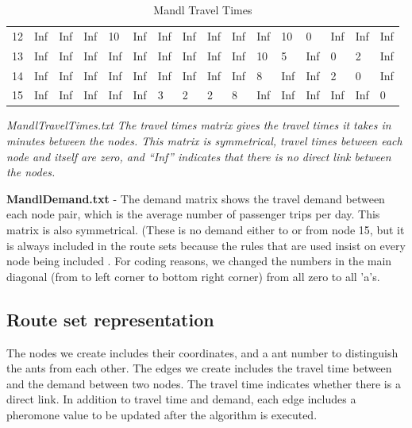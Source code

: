 \begin{table}[h!]
\begin{tabular}{|l|lllllllllllllll|}
    12 & Inf     & Inf      & Inf     & 10        & Inf      & Inf       & Inf      &  Inf     &  Inf     &  Inf     &  10     & 0           & Inf      & Inf       & Inf   \\
    13 & Inf     & Inf      & Inf     &  Inf      &  Inf     & Inf       &  Inf     &  Inf     &  Inf     & 10       &  5      & Inf         &  0       & 2         &  Inf  \\
    14 & Inf     & Inf      &  Inf    &  Inf      &  Inf     & Inf       &  Inf     & Inf      & Inf      & 8        &  Inf    &  Inf        & 2        & 0         &   Inf \\
    15 & Inf     & Inf      & Inf     & Inf       & Inf      & 3         &  2       &  2       & 8        & Inf      & Inf     &
     Inf         &  Inf     & Inf       &  0    \\
     \hline
    \end{tabular}
    \caption {Mandl Travel Times}
    \textit{MandlTravelTimes.txt The travel times matrix gives the travel times it takes in minutes between the nodes. This matrix is symmetrical, travel times between each node and itself are zero, and ``Inf'' indicates that there is no direct link between the nodes.}
\end{table}



\textbf{MandlDemand.txt} - The demand matrix shows the travel demand between each node pair, which is the average number of passenger trips per day. This matrix is also symmetrical. (These is no demand either to or from node 15, but it is always included in the route sets because the rules that are used insist on every node being included \citep{fan09}. For coding reasons, we changed the numbers in the main diagonal (from to left corner to bottom right corner) from all zero to all ’a’s. 






\subsection{Route set representation}

The nodes we create includes their coordinates, and a ant number to distinguish the ants from each other. 
The edges we create includes the travel time between and the demand between two nodes. 
The travel time indicates whether there is a direct link. %
In addition to travel time and demand, each edge includes a pheromone value to be updated after the algorithm is executed.

